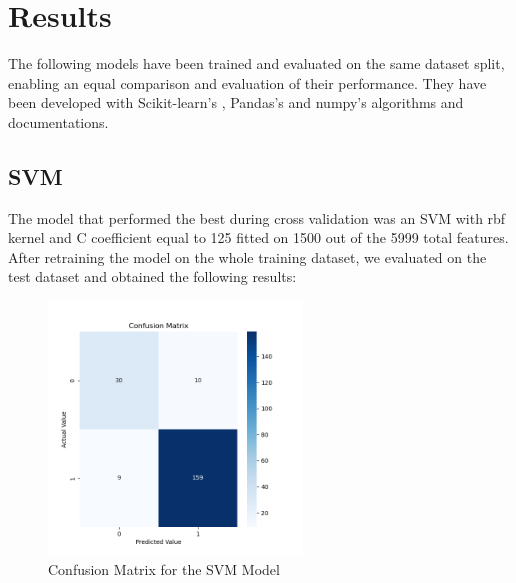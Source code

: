 \documentclass{article}
\begin{document}
\section{Results}

The following models have been trained and evaluated on the same dataset split, enabling an equal comparison and evaluation of their performance. They have been developed with Scikit-learn's \citep{scikit-learn}, Pandas's \citep{pandas} and numpy's \citep{numpy} algorithms and documentations. 

\subsection{SVM}

The model that performed the best during cross validation was an SVM with rbf kernel and C coefficient equal to 125 fitted on 1500 out of the 5999 total features. After retraining the model on the whole training dataset, we evaluated on the test dataset and obtained the following results:

\begin{figure}[h]
	\centering
	\includegraphics[width=0.6\textwidth]{confusion_matrix_SVM.png}
	 \vspace{-1em}
	\caption{Confusion Matrix for the SVM Model}
    \label{fig:Confusion Matrix of the SVM}
\end{figure}
\end{document}
